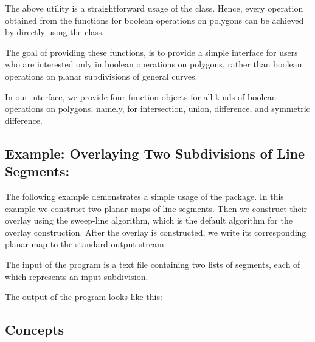 \begin{ccTexOnly}
The above utility is a straightforward usage of the 
class. Hence, every operation obtained from the functions 
for boolean operations on polygons can be achieved by 
directly using the  
class. 

The goal of providing these functions, is to 
provide a simple interface for users who are 
interested only in boolean operations on 
polygons, rather than boolean operations 
on planar subdivisions of general curves.

In our interface, we provide four function objects 
for all kinds of boolean operations on polygons,
namely, for intersection, union, difference, and 
symmetric difference.


\subsection*{Example: Overlaying Two Subdivisions of Line Segments:}
The following example demonstrates a simple usage of the 
 package.
In this example we construct two planar maps of line segments. 
Then we construct their overlay using the sweep-line algorithm, which is 
the default algorithm for the overlay construction. 
After the overlay is constructed, we write its corresponding planar map to the 
standard output stream. 

The input of the program is a text file containing two lists of segments, 
each of which represents an input subdivision.

The output of the program looks like this:


\subsection*{Concepts}
\\
\\
\\
\\
\\
\\
\\


\end{ccTexOnly}

